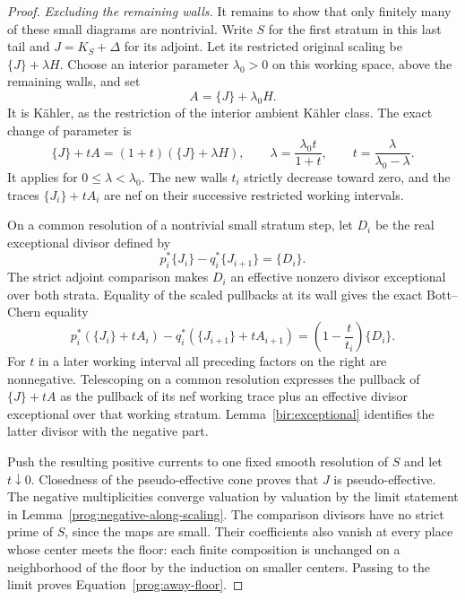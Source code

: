 \begin{proof}
\smallskip\noindent\emph{Excluding the remaining walls.}
It remains to show that only finitely many of these small
diagrams are nontrivial.  Write \(S\) for the first stratum
in this last tail and \(J=K_S+\Delta\) for its adjoint.
Let its restricted original scaling be
\(\{J\}+\lambda H\).  Choose an interior parameter
\(\lambda_0>0\) on this working space, above the remaining
walls, and set
\[
 A=\{J\}+\lambda_0H.
\]
It is Kähler, as the restriction of the interior ambient
Kähler class.  The exact change of parameter is
\begin{equation}
 \{J\}+tA=(1+t)(\{J\}+\lambda H),\qquad
 \lambda=\frac{\lambda_0t}{1+t},\qquad
 t=\frac{\lambda}{\lambda_0-\lambda}.
 \label{prog:reparameterization}
\end{equation}
It applies for \(0\leq\lambda<\lambda_0\).  The new walls
\(t_i\) strictly decrease toward zero, and the traces
\(\{J_i\}+tA_i\) are nef on their successive restricted
working intervals.

On a common resolution of a nontrivial small stratum step, let \(D_i\)
be the real exceptional divisor defined by
\[
 p_i^*\{J_i\}-q_i^*\{J_{i+1}\}=\{D_i\}.
\]
The strict adjoint comparison makes \(D_i\) an effective
nonzero divisor exceptional over both strata.  Equality of
the scaled pullbacks at its wall gives the exact
Bott--Chern equality
\begin{equation}
 p_i^*(\{J_i\}+tA_i)-q_i^*(\{J_{i+1}\}+tA_{i+1})
 =\left(1-\frac{t}{t_i}\right)\{D_i\}.
 \label{prog:restricted-comparison}
\end{equation}
For \(t\) in a later working interval all preceding factors
on the right are nonnegative.  Telescoping on a common
resolution expresses the pullback of \(\{J\}+tA\) as the
pullback of its nef working trace plus an effective divisor
exceptional over that working stratum.
Lemma~\ref{bir:exceptional} identifies the latter divisor
with the negative part.

Push the resulting positive currents to one fixed smooth
resolution of \(S\) and let \(t\downarrow0\).  Closedness of
the pseudo-effective cone proves that \(J\) is
pseudo-effective.  The negative multiplicities converge
valuation by valuation by the limit statement in
Lemma~\ref{prog:negative-along-scaling}. The comparison divisors
have no strict prime of \(S\), since the maps are small.
Their coefficients also vanish at every place whose center
meets the floor: each finite composition is unchanged on a
neighborhood of the floor by the induction on smaller
centers.  Passing to the limit proves
Equation~\eqref{prog:away-floor}.


\end{proof}
